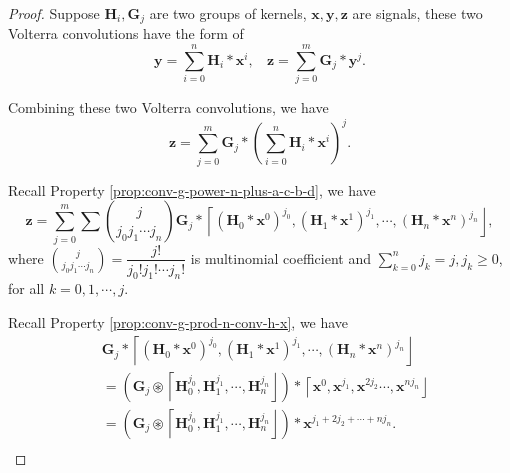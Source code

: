 \documentclass[twoside,11pt]{article}
\def\oconv{\circledast}
\def\tvar#1{\mathbf{#1}} %
\def\lcerfl#1{\left\lceil{#1}\right\rfloor}
\begin{document}
\begin{proof}
  Suppose \(\tvar{H}_i, \tvar{G}_j\) are two groups of kernels, \(\tvar{x}, \tvar{y}, \tvar{z}\) are signals, these two Volterra convolutions have the form of
  \begin{equation*}
    \tvar{y} = \sum_{i=0}^{n} \tvar{H}_i * \tvar{x}^i, ~~~~
    \tvar{z} = \sum_{j=0}^{m} \tvar{G}_j * \tvar{y}^j.
  \end{equation*}

  Combining these two Volterra convolutions, we have
  \begin{equation*}
    \tvar{z} = \sum_{j=0}^{m} \tvar{G}_j * \left(\sum_{i=0}^{n} \tvar{H}_i * \tvar{x}^i\right)^j.
  \end{equation*}

  Recall Property \ref{prop:conv-g-power-n-plus-a-c-b-d}, we have
  \begin{equation*}
    \tvar{z}
    = \sum_{j=0}^{m} \sum \binom{j}{j_0 j_1 \cdots j_n} \tvar{G}_j * \lcerfl{
      (\tvar{H}_0 * \tvar{x}^0)^{j_0},
      (\tvar{H}_1 * \tvar{x}^1)^{j_1},
      \cdots,
      (\tvar{H}_n * \tvar{x}^n)^{j_n}
    },
  \end{equation*}
  where \(\binom{j}{j_0 j_1 \cdots j_n} = \dfrac{j!}{j_0! j_1! \cdots j_n!}\) is multinomial coefficient and \(\sum_{k=0}^{n} j_k = j, j_k \ge 0\), for all \(k = 0, 1, \cdots, j\).

  Recall Property \ref{prop:conv-g-prod-n-conv-h-x}, we have
  \begin{equation*}
    \begin{aligned}
       & \tvar{G}_j * \lcerfl{
        (\tvar{H}_0 * \tvar{x}^0)^{j_0},
        (\tvar{H}_1 * \tvar{x}^1)^{j_1},
        \cdots,
        (\tvar{H}_n * \tvar{x}^n)^{j_n}
      }                                                                                                           \\
       & = \left( \tvar{G}_j \oconv \lcerfl{\tvar{H}_0^{j_0}, \tvar{H}_1^{j_1}, \cdots, \tvar{H}_n^{j_n}} \right)
      * \lcerfl{\tvar{x}^0, \tvar{x}^{j_1}, \tvar{x}^{2 j_2} \cdots, \tvar{x}^{n j_n}}                            \\
       & = \left( \tvar{G}_j \oconv \lcerfl{\tvar{H}_0^{j_0}, \tvar{H}_1^{j_1}, \cdots, \tvar{H}_n^{j_n}} \right)
      * \tvar{x}^{j_1 + 2 j_2 + \cdots + n j_n}.                                                                  \\
    \end{aligned}
  \end{equation*}


\end{proof}
\end{document}
